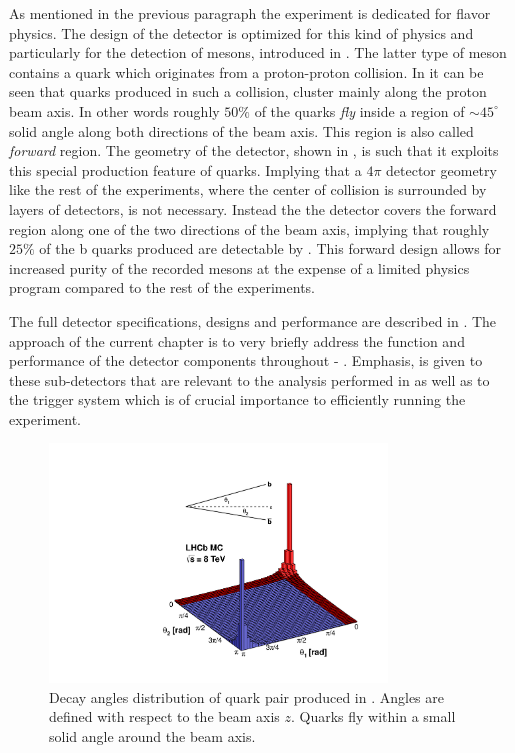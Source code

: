 As mentioned in the previous paragraph the \lhcb experiment is dedicated for flavor physics.
The design of the detector is optimized for this kind of physics and particularly for the detection
of \B mesons, introduced in . The latter type of meson contains a \bquark quark
which originates from a proton-proton collision. In  it can be seen
that \bquark quarks produced in such a collision, cluster mainly along the proton beam axis. In other words
roughly $50\%$ of the \bquark quarks {\it fly} inside a region of $\sim 45^\circ$ solid angle along both
directions of the beam axis. This region is also called {\it forward} region. The geometry of the \lhcb detector,
shown in , is such that it exploits this special production feature of \bquark quarks. Implying that
a $4\pi$ detector geometry like the rest of the \lhc experiments, where the center of collision is surrounded
by layers of detectors, is not necessary. Instead the the \lhcb detector covers the forward region along one
of the two directions of the beam axis, implying that roughly $25\%$ of the b quarks produced are detectable
by \lhcb. This forward design allows for increased purity of the recorded \B mesons at the expense of a limited
physics program compared to the rest of the \lhcb experiments.

The full \lhcb detector specifications, designs and performance are described in \cite{Aaij:2014jba}.
The approach of the current chapter is to very briefly address the function and performance of the detector components
throughout  - . Emphasis, is given to these sub-detectors that are relevant
to the analysis performed in  as well as to the trigger system which is of crucial importance
to efficiently running the \lhcb experiment.

\begin{figure}[t]
  \centering
  \includegraphics[width=0.8\textwidth, trim=0cm 0cm 0cm 2.5cm, clip=true]{Figures/Chapter2/08_rad_acc_scheme_right}
  \caption{Decay angles distribution of \bquark quark pair produced in \lhcb. Angles are defined with
           respect to the beam axis $z$. Quarks fly within a small solid angle around the beam axis.}
  \label{bb_roduction_angles}
\end{figure}
